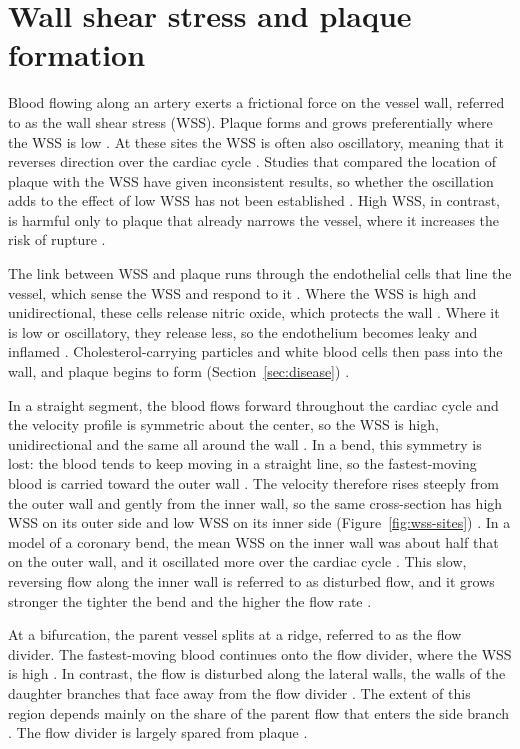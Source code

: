 \section{Wall shear stress and plaque formation}
\label{sec:wss}

Blood flowing along an artery exerts a frictional force on the vessel wall, referred to as the wall shear stress (WSS).
Plaque forms and grows preferentially where the WSS is low \cite{chatzizisis2007ess,samady2011wss,yamamoto2017ess}.
At these sites the WSS is often also oscillatory, meaning that it reverses direction over the cardiac cycle \cite{chatzizisis2007ess}.
Studies that compared the location of plaque with the WSS have given inconsistent results, so whether the oscillation adds to the effect of low WSS has not been established \cite{peiffer2013wss}.
High WSS, in contrast, is harmful only to plaque that already narrows the vessel, where it increases the risk of rupture \cite{bajraktari2021highwss,samady2011wss}.

The link between WSS and plaque runs through the endothelial cells that line the vessel, which sense the WSS and respond to it \cite{davies2009shear}.
Where the WSS is high and unidirectional, these cells release nitric oxide, which protects the wall \cite{chiu2011disturbed}.
Where it is low or oscillatory, they release less, so the endothelium becomes leaky and inflamed \cite{chiu2011disturbed}.
Cholesterol-carrying particles and white blood cells then pass into the wall, and plaque begins to form (Section~\ref{sec:disease}) \cite{chiu2011disturbed}.

In a straight segment, the blood flows forward throughout the cardiac cycle and the velocity profile is symmetric about the center, so the WSS is high, unidirectional and the same all around the wall \cite{chiu2011disturbed}.
In a bend, this symmetry is lost: the blood tends to keep moving in a straight line, so the fastest-moving blood is carried toward the outer wall \cite{ku1997blood,dean1927curved}.
The velocity therefore rises steeply from the outer wall and gently from the inner wall, so the same cross-section has high WSS on its outer side and low WSS on its inner side (Figure~\ref{fig:wss-sites}) \cite{ku1997blood,qiu2000compliant}.
In a model of a coronary bend, the mean WSS on the inner wall was about half that on the outer wall, and it oscillated more over the cardiac cycle \cite{qiu2000compliant}.
This slow, reversing flow along the inner wall is referred to as disturbed flow, and it grows stronger the tighter the bend and the higher the flow rate \cite{chiu2011disturbed,ku1997blood}.

At a bifurcation, the parent vessel splits at a ridge, referred to as the flow divider.
The fastest-moving blood continues onto the flow divider, where the WSS is high \cite{zarins1983carotid,antoniadis2015bifurcation}.
In contrast, the flow is disturbed along the lateral walls, the walls of the daughter branches that face away from the flow divider \cite{asakura1990flow,antoniadis2015bifurcation}.
The extent of this region depends mainly on the share of the parent flow that enters the side branch \cite{antoniadis2015bifurcation}.
The flow divider is largely spared from plaque \cite{asakura1990flow,vandergiessen2009bifurcation,nakazawa2010pathological}.

